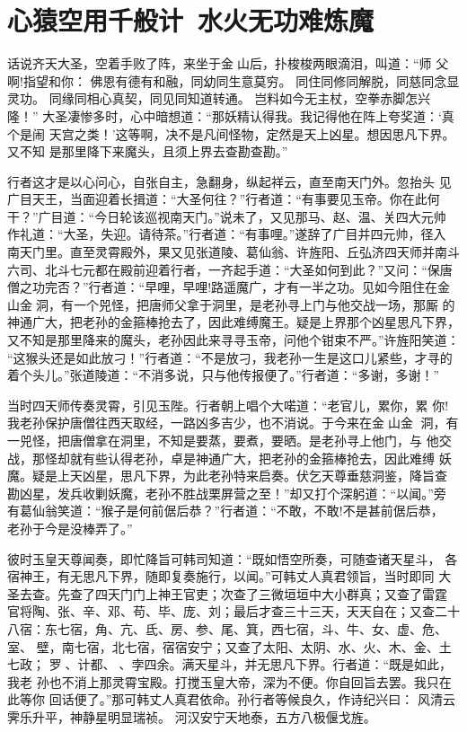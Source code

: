 \chapter{心猿空用千般计~水火无功难炼魔}

话说齐天大圣，空着手败了阵，来坐于金山后，扑梭梭两眼滴泪，叫道：“师
父啊!指望和你：
佛恩有德有和融，同幼同生意莫穷。
同住同修同解脱，同慈同念显灵功。
同缘同相心真契，同见同知道转通。
岂料如今无主杖，空拳赤脚怎兴隆！”
大圣凄惨多时，心中暗想道：“那妖精认得我。我记得他在阵上夸奖道：‘真个是闹
天宫之类！’这等啊，决不是凡间怪物，定然是天上凶星。想因思凡下界。又不知
是那里降下来魔头，且须上界去查勘查勘。”

行者这才是以心问心，自张自主，急翻身，纵起祥云，直至南天门外。忽抬头
见广目天王，当面迎着长揖道：“大圣何往？”行者道：“有事要见玉帝。你在此何
干？”广目道：“今日轮该巡视南天门。”说未了，又见那马、赵、温、关四大元帅
作礼道：“大圣，失迎。请待茶。”行者道：“有事哩。”遂辞了广目并四元帅，径入
南天门里。直至灵霄殿外，果又见张道陵、葛仙翁、许旌阳、丘弘济四天师并南斗
六司、北斗七元都在殿前迎着行者，一齐起手道：“大圣如何到此？”又问：“保唐
僧之功完否？”行者道：“早哩，早哩!路遥魔广，才有一半之功。见如今阻住在金
山金洞，有一个兕怪，把唐师父拿于洞里，是老孙寻上门与他交战一场，那厮
的神通广大，把老孙的金箍棒抢去了，因此难缚魔王。疑是上界那个凶星思凡下界，
又不知是那里降来的魔头，老孙因此来寻寻玉帝，问他个钳束不严。”许旌阳笑道：
“这猴头还是如此放刁！”行者道：“不是放刁，我老孙一生是这口儿紧些，才寻的
着个头儿。”张道陵道：“不消多说，只与他传报便了。”行者道：“多谢，多谢！”

当时四天师传奏灵霄，引见玉陛。行者朝上唱个大喏道：“老官儿，累你，累
你!我老孙保护唐僧往西天取经，一路凶多吉少，也不消说。于今来在金山金
洞，有一兕怪，把唐僧拿在洞里，不知是要蒸，要煮，要晒。是老孙寻上他门，与
他交战，那怪却就有些认得老孙，卓是神通广大，把老孙的金箍棒抢去，因此难缚
妖魔。疑是上天凶星，思凡下界，为此老孙特来启奏。伏乞天尊垂慈洞鉴，降旨查
勘凶星，发兵收剿妖魔，老孙不胜战栗屏营之至！”却又打个深躬道：“以闻。”旁
有葛仙翁笑道：“猴子是何前倨后恭？”行者道：“不敢，不敢!不是甚前倨后恭，
老孙于今是没棒弄了。”

彼时玉皇天尊闻奏，即忙降旨可韩司知道：“既如悟空所奏，可随查诸天星斗，
各宿神王，有无思凡下界，随即复奏施行，以闻。”可韩丈人真君领旨，当时即同
大圣去查。先查了四天门门上神王官吏；次查了三微垣垣中大小群真；又查了雷霆
官将陶、张、辛、邓、苟、毕、庞、刘；最后才查三十三天，天天自在；又查二十
八宿：东七宿，角、亢、氐、房、参、尾、箕，西七宿，斗、牛、女、虚、危、室、
壁，南七宿，北七宿，宿宿安宁；又查了太阳、太阴、水、火、木、金、土七政；
罗、计都、、孛四余。满天星斗，并无思凡下界。行者道：“既是如此，我老
孙也不消上那灵霄宝殿。打搅玉皇大帝，深为不便。你自回旨去罢。我只在此等你
回话便了。”那可韩丈人真君依命。孙行者等候良久，作诗纪兴曰：
风清云霁乐升平，神静星明显瑞祯。
河汉安宁天地泰，五方八极偃戈旌。

